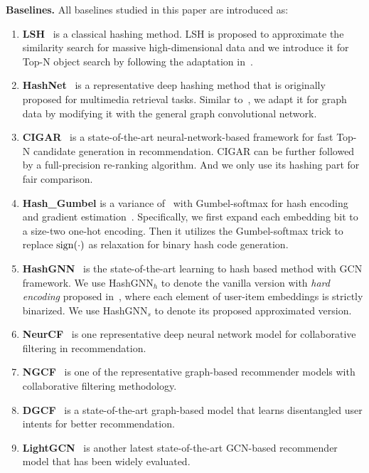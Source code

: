 \textbf{Baselines.} All baselines studied in this paper are introduced as:
\label{app:baselines}
\begin{enumerate}[leftmargin=*]
\item \textbf{LSH}~\cite{lsh} is a classical hashing method. LSH is proposed to approximate the similarity search for massive high-dimensional data and we introduce it for Top-N object search by following the adaptation in~\cite{hashgnn}. 

\item \textbf{HashNet}~\cite{hashnet} is a representative deep hashing method that is originally proposed for multimedia retrieval tasks.
Similar to~\cite{hashgnn}, we adapt it for graph data by modifying it with the general graph convolutional network.

\item \textbf{CIGAR}~\cite{kang2019candidate} is a state-of-the-art neural-network-based framework for fast Top-N candidate generation in recommendation. 
CIGAR can be further followed by a full-precision re-ranking algorithm. And we only use its hashing part for fair comparison.

\item \textbf{Hash\_Gumbel} is a variance of \model~with Gumbel-softmax for hash encoding and gradient estimation~\cite{gumbel1,gumbel2}.
Specifically, we first expand each embedding bit to a size-two one-hot encoding. 
Then it utilizes the Gumbel-softmax trick to replace $\operatorname{sign}(\cdot)$ as relaxation for binary hash code generation. 

\item \textbf{HashGNN}~\cite{hashgnn} is the state-of-the-art learning to hash based method with GCN framework. 
We use HashGNN$_{h}$ to denote the vanilla version with \textit{hard encoding} proposed in~\cite{hashgnn}, where each element of user-item embeddings is strictly binarized. 
We use HashGNN$_{s}$ to denote its proposed approximated version.

\item \textbf{NeurCF}~\cite{neurcf} is one representative deep neural network model for collaborative filtering in recommendation. 

\item \textbf{NGCF}~\cite{ngcf} is one of the representative graph-based recommender models with collaborative filtering methodology. 

\item \textbf{DGCF}~\cite{dgcf} is a state-of-the-art graph-based model that learns disentangled user intents for better recommendation. 

\item \textbf{LightGCN}~\cite{lightgcn} is another latest state-of-the-art GCN-based recommender model that has been widely evaluated. 

\end{enumerate}

